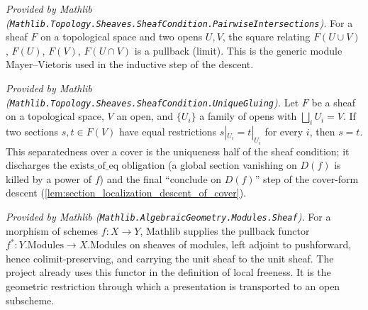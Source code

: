 

\begin{lemma}
  \label{lem:isLimitPullbackCone_mathlib}
  \mathlibok
  \textit{Provided by Mathlib
  (\texttt{Mathlib.Topology.Sheaves.SheafCondition.PairwiseIntersections}).}
  For a sheaf \(F\) on a topological space and two opens \(U, V\), the square relating
  \(F(U \cup V)\), \(F(U)\), \(F(V)\), \(F(U \cap V)\) is a pullback (limit). This is the generic
  module Mayer--Vietoris used in the inductive step of the descent.
\end{lemma}


\begin{lemma}
  \label{lem:eq_of_locally_eq_mathlib}
  \mathlibok
  \textit{Provided by Mathlib
  (\texttt{Mathlib.Topology.Sheaves.SheafCondition.UniqueGluing}).}
  Let \(F\) be a sheaf on a topological space, \(V\) an open, and \(\{U_i\}\) a family of opens with
  \(\bigsqcup_i U_i = V\). If two sections \(s, t \in F(V)\) have equal restrictions
  \(s|_{U_i} = t|_{U_i}\) for every \(i\), then \(s = t\). This separatedness over a cover is the
  uniqueness half of the sheaf condition; it discharges the \(\mathrm{exists\_of\_eq}\) obligation
  (a global section vanishing on \(D(f)\) is killed by a power of \(f\)) and the final
  ``conclude on \(D(f)\)'' step of the cover-form descent
  (\cref{lem:section_localization_descent_of_cover}).
\end{lemma}





\begin{lemma}
  \label{lem:modules_pullback_mathlib}
  \mathlibok
  \textit{Provided by Mathlib (\texttt{Mathlib.AlgebraicGeometry.Modules.Sheaf}).}
  For a morphism of schemes \(f : X \to Y\), Mathlib supplies the pullback functor
  \(f^{*} : Y.\mathrm{Modules} \to X.\mathrm{Modules}\) on sheaves of modules, left adjoint to
  pushforward, hence colimit-preserving, and carrying the unit sheaf to the unit sheaf. The project
  already uses this functor in the definition of local freeness. It is the geometric restriction
  through which a presentation is transported to an open subscheme.
\end{lemma}

